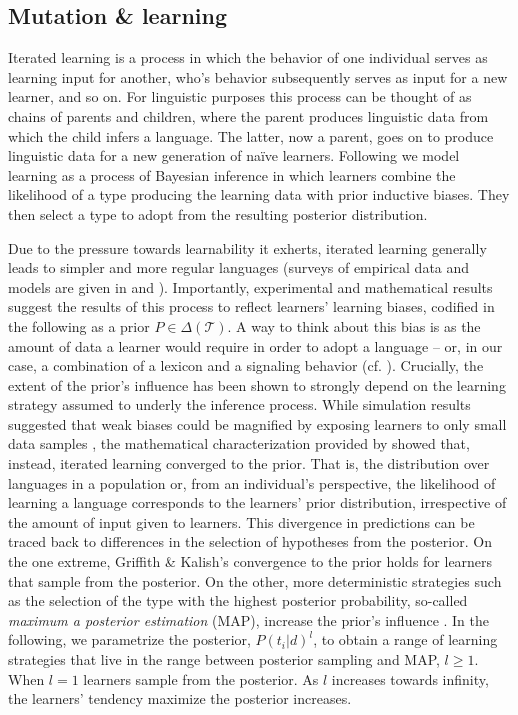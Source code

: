 \documentclass[a4paper]{article}
\begin{document}
\subsection{Mutation \& learning}\label{sec:mutation}
Iterated learning is a process in which the behavior of one individual serves as learning input for another, who's behavior subsequently serves as input for a new learner, and so on. For linguistic purposes this process can be thought of as chains of parents and children, where the parent produces linguistic data from which the child infers a language. The latter, now a parent, goes on to produce linguistic data for a new generation of na\"ive learners. Following \citet{griffiths+kalish:2007} we model learning as a process of Bayesian inference in which learners combine the likelihood of a type producing the learning data with prior inductive biases. They then select a type to adopt from the resulting posterior distribution.

Due to the pressure towards learnability it exherts, iterated learning generally leads to simpler and more regular languages (surveys of empirical data and models are given in \citealt{kirby+etal:2014} and \citealt{tamariz+kirby:2016}). Importantly, experimental and mathematical results suggest the results of this process to reflect learners' learning biases, codified in the following as a prior $P \in \Delta(\mathcal{T})$. A way to think about this bias is as the amount of data a learner would require in order to adopt a language -- or, in our case, a combination of a lexicon and a signaling behavior (cf. \citealt[450]{griffiths+kalish:2007}). Crucially, the extent of the prior's influence has been shown to strongly depend on the learning strategy assumed to underly the inference process. While simulation results suggested that weak biases could be magnified by exposing learners to only small data samples \citep{brighton:2002}, the mathematical characterization provided by \citet{griffiths+kalish:2007} showed that, instead, iterated learning converged to the prior. That is, the distribution over languages in a population or, from an individual's perspective, the likelihood of learning a language corresponds to the learners' prior distribution, irrespective of the amount of input given to learners. This divergence in predictions can be traced back to differences in the selection of hypotheses from the posterior. On the one extreme, Griffith \& Kalish's convergence to the prior holds for learners that sample from the posterior. On the other, more deterministic strategies such as the selection of the type with the highest posterior probability, so-called {\it maximum a posterior estimation} (MAP), increase the prior's influence \citep{griffiths+kalish:2007,kirby+etal:2007}. In the following, we parametrize the posterior, $P(t_i|d)^l$, to obtain a range of learning strategies that live in the range between posterior sampling and MAP, $l \geq 1$. When $l = 1$ learners sample from the posterior. As $l$ increases towards infinity, the learners' tendency maximize the posterior increases. 
\end{document}
